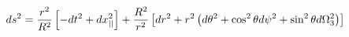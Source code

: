 \begin{equation*}
ds^{2}=\frac{r^{2}}{R^{2}}\left[ -dt^{2}+dx_{||}^{2}\right] +\frac{R^{2}}{%
r^{2}}\left[ dr^{2}+r^{2}\left( d\theta ^{2}+\cos ^{2}\theta d\psi ^{2}+\sin
^{2}\theta d\Omega _{3}^{2}\right) \right]
\end{equation*}

